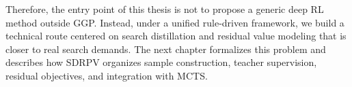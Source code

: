 % 

Therefore, the entry point of this thesis is not to propose a generic deep RL method outside GGP. Instead, under a unified rule-driven framework, we build a technical route centered on search distillation and residual value modeling that is closer to real search demands. The next chapter formalizes this problem and describes how SDRPV organizes sample construction, teacher supervision, residual objectives, and integration with MCTS.

